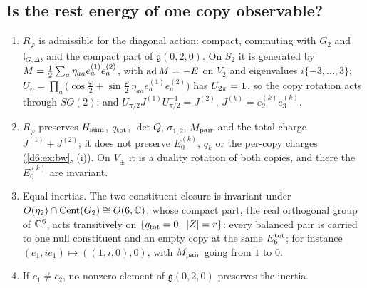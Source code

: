 \subsection{Is the rest energy of one copy observable?}
\label{d6:sec:gauge}

\begin{proposition}
\label{d6:prop:gauge}
\begin{enumerate}[label=(\roman*),leftmargin=2.2em]
\item $R_\varphi$ is admissible for the diagonal action: compact, commuting with $G_2$ and $\mathfrak l_{G,\Delta}$, and the compact part of
$\mathfrak g(0,2,0)$. On $S_2$ it is generated by $M=\tfrac12\sum_a\eta_{aa}e^{(1)}_ae^{(2)}_a$, with $\operatorname{ad} M=-E$ on $V_2$ and eigenvalues
$i\{-3,\dots,3\}$; $U_\varphi=\prod_a\bigl(\cos\tfrac\varphi2+\sin\tfrac\varphi2\,\eta_{aa}e^{(1)}_ae^{(2)}_a\bigr)$ has $U_{2\pi}=\mathbf 1$, so the copy rotation
acts through $SO(2)$; and $U_{\pi/2}J^{(1)}U_{\pi/2}^{-1}=J^{(2)}$, $J^{(k)}=e^{(k)}_2e^{(k)}_3$.
\item $R_\varphi$ preserves $H_{\rm sum}$, $q_{\rm tot}$, $\det Q$, $\sigma_{1,2}$, $M_{\rm pair}$ and the total charge $J^{(1)}+J^{(2)}$; it does not
preserve $E_0^{(k)}$, $q_k$ or the per-copy charges (\cref{d6:ex:bw}, (i)). On $V_\pm$ it is a duality rotation of both copies, and there the
$E_0^{(k)}$ are invariant.
\item Equal inertias. The two-constituent closure is invariant under $O(\eta_2)\cap\operatorname{Cent}(G_2)\cong O(6,\mathbb{C})$, whose compact part, the real
orthogonal group of $\mathbb{C}^6$, acts transitively on $\{q_{\rm tot}=0,\ |Z|=r\}$: every balanced pair is carried to one null constituent and an empty
copy at the same $E_6^{\rm tot}$; for instance $(e_1,ie_1)\mapsto((1,i,0),0)$, with $M_{\rm pair}$ going from $1$ to $0$.
\item If $c_1\neq c_2$, no nonzero element of $\mathfrak g(0,2,0)$ preserves the inertia.
\end{enumerate}
\end{proposition}

